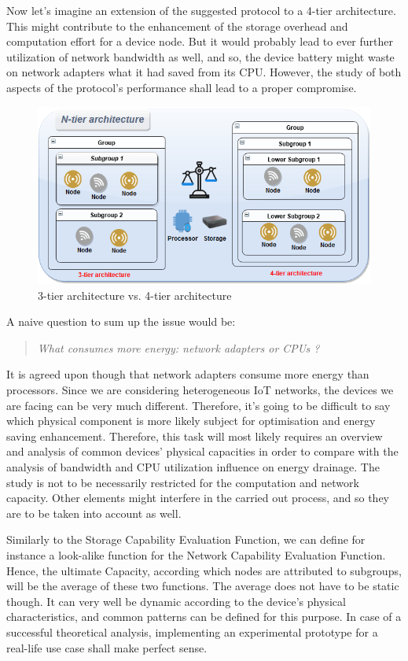 Now let’s imagine an extension of the suggested protocol to a 4-tier architecture. This might contribute to the enhancement of the storage overhead and computation effort for a device node. But it would probably lead to ever further utilization of network bandwidth as well, and so, the device battery might waste on network adapters what it had saved from its CPU. However, the study of both aspects of the protocol’s performance shall lead to a proper compromise.

\begin{figure}[htbp]
	\centerline{\includegraphics[scale=0.60]{figures/mgkmp/n-tier.png}}
	\caption{3-tier architecture vs. 4-tier architecture}
	\label{fig:n-tier}
\end{figure}

A naive question to sum up the issue would be:

\begin{quote}
	\emph{What consumes more energy: network adapters or CPUs ?}
\end{quote}

It is agreed upon though that network adapters consume more energy than processors. Since we are considering heterogeneous IoT networks, the devices we are facing can be very much different. Therefore, it’s going to be difficult to say which physical component is more likely subject for optimisation and energy saving enhancement. Therefore, this task will most likely requires an overview and  analysis of common devices’ physical capacities in order to compare with the analysis of bandwidth and CPU utilization influence on energy drainage. The study is not to be necessarily restricted for the computation and network capacity. Other elements might interfere in the carried out process, and so they are to be taken into account as well.

Similarly to the Storage Capability Evaluation Function, we can define for instance a look-alike function for the Network Capability Evaluation Function. Hence, the ultimate Capacity, according which nodes are attributed to subgroups, will be the average of these two functions. The average does not have to be static though. It can very well be dynamic according to the device’s physical characteristics, and common patterns can be defined for this purpose. In case of a successful theoretical analysis, implementing an experimental prototype for a real-life use case shall make perfect sense.

